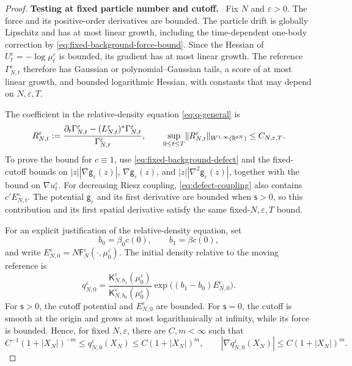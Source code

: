 \documentclass[11pt,reqno]{amsart}
\numberwithin{equation}{section}
\theoremstyle{plain}
\theoremstyle{remark}
\DeclarePairedDelimiter{\norm}{\lVert}{\rVert}
\renewcommand{\d}{\mathsf{d}}\newcommand{\s}{\mathsf{s}}
\newcommand{\K}{\mathsf K}\newcommand{\g}{\mathsf g}\newcommand{\Fr}{\mathsf F}
\newcommand{\parheading}[1]{\par\medskip\noindent\textbf{#1}\ }
\begin{document}
\begin{proof}
\parheading{Testing at fixed particle number and cutoff.}
Fix $N$ and $\varepsilon>0$. The force and its positive-order derivatives are bounded. The particle drift is globally Lipschitz and has at most linear growth, including the time-dependent one-body correction by \eqref{eq:fixed-background-force-bound}. Since the Hessian of $U_t^\varepsilon=-\log\mu_t^\varepsilon$ is bounded, its gradient has at most linear growth. The reference $\Gamma_{N,t}^\varepsilon$ therefore has Gaussian or polynomial--Gaussian tails, a score of at most linear growth, and bounded logarithmic Hessian, with constants that may depend on $N,\varepsilon,T$.

The coefficient in the relative-density equation \eqref{eq:q-general} is
\begin{equation}\label{eq:cutoff-defect-coefficient}
 R_{N,t}^\varepsilon:=
 \frac{\partial_t\Gamma_{N,t}^\varepsilon-(L_{N,t}^\varepsilon)^*\Gamma_{N,t}^\varepsilon}
      {\Gamma_{N,t}^\varepsilon},
 \qquad
 \sup_{0\le t\le T}\norm{R_{N,t}^\varepsilon}_{W^{1,\infty}(\R^{\d N})}
 \le C_{N,\varepsilon,T}.
\end{equation}
To prove the bound for $c\equiv1$, use \eqref{eq:fixed-background-defect} and the fixed-cutoff bounds on $|z||\nabla\g_\varepsilon(z)|$, $\nabla\g_\varepsilon(z)$, and $|z||\nabla^2\g_\varepsilon(z)|$, together with the bound on $\nabla u_t^\varepsilon$. For decreasing Riesz coupling, \eqref{eq:defect-coupling} also contains $c'E_{N,t}^\varepsilon$. The potential $\g_\varepsilon$ and its first derivative are bounded when $\s>0$, so this contribution and its first spatial derivative satisfy the same fixed-$N,\varepsilon,T$ bound.

For an explicit justification of the relative-density equation, set
\begin{equation}\label{eq:cutoff-initial-couplings}
 b_0=\beta_0c(0),\qquad b_1=\beta c(0),
\end{equation}
and write $E_{N,0}^\varepsilon=N\Fr_N^\varepsilon(\cdot,\mu_0^\varepsilon)$. The initial density relative to the moving reference is
\begin{equation}\label{eq:cutoff-initial-ratio}
 q_{N,0}^\varepsilon
 =\frac{\K_{N,b_1}^\varepsilon(\mu_0^\varepsilon)}
        {\K_{N,b_0}^\varepsilon(\mu_0^\varepsilon)}
   \exp\bigl((b_1-b_0)E_{N,0}^\varepsilon\bigr).
\end{equation}
For $\s>0$, the cutoff potential and $E_{N,0}^\varepsilon$ are bounded. For $\s=0$, the cutoff is smooth at the origin and grows at most logarithmically at infinity, while its force is bounded. Hence, for fixed $N,\varepsilon$, there are $C,m<\infty$ such that
\begin{equation}\label{eq:cutoff-initial-growth}
 C^{-1}(1+|X_N|)^{-m}\le q_{N,0}^\varepsilon(X_N)
 \le C(1+|X_N|)^m,
 \qquad |\nabla q_{N,0}^\varepsilon(X_N)|\le C(1+|X_N|)^m.
\end{equation}


\end{proof}
\end{document}
